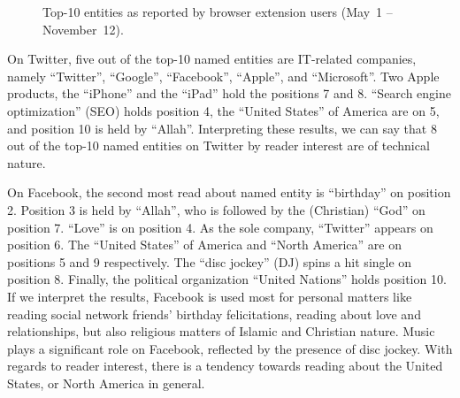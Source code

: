 \documentclass{iosart2c}
\begin{document}
\begin{figure}
  \centering
    \qquad
\caption{Top-10 entities as reported by browser extension users (May~1 -- November~12).}
\label{fig:top10}
\end{figure}

On Twitter, five out of the top-10 named entities are IT-related companies, namely ``Twitter'', ``Google'', ``Facebook'', ``Apple'', and ``Microsoft''.
Two Apple products, the ``iPhone'' and the ``iPad'' hold the positions 7 and 8.
``Search engine optimization'' (SEO) holds position 4, the ``United States'' of America are on 5, and position 10 is held by ``Allah''.
Interpreting these results, we can say that 8 out of the top-10 named entities on Twitter by reader interest are of technical nature.

On Facebook, the second most read about named entity is ``birthday'' on position 2.
Position 3 is held by ``Allah'', who is followed by the (Christian) ``God'' on position 7.
``Love'' is on position 4.
As the sole company, ``Twitter'' appears on position 6.
The ``United States'' of America and ``North America'' are on positions 5 and 9 respectively.
The ``disc jockey'' (DJ) spins a hit single on position 8.
Finally, the political organization ``United Nations'' holds position 10.
If we interpret the results, Facebook is used most for personal matters like reading social network friends' birthday felicitations, reading about love and relationships, but also religious matters of Islamic and Christian nature.
Music plays a significant role on Facebook, reflected by the presence of disc jockey.
With regards to reader interest, there is a tendency towards reading about the United States, or North America in general.
\end{document}
